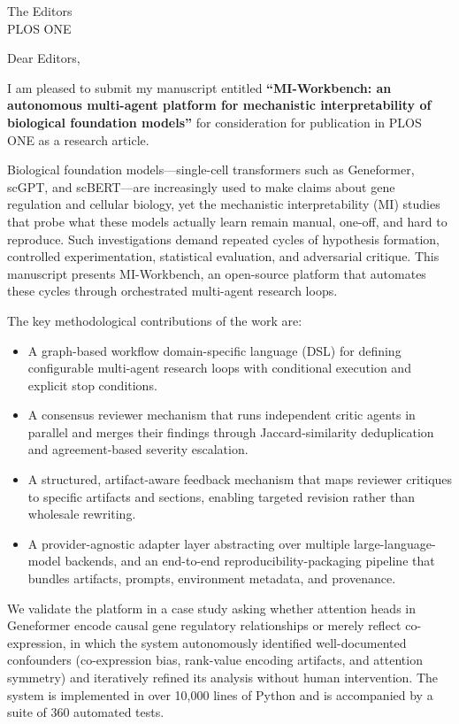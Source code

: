 \documentclass[11pt,letterpaper]{letter}
\begin{document}
\begin{letter}{The Editors \\ PLOS ONE}

\opening{Dear Editors,}

I am pleased to submit my manuscript entitled \textbf{``MI-Workbench: an autonomous multi-agent platform for mechanistic interpretability of biological foundation models''} for consideration for publication in PLOS ONE as a research article.

Biological foundation models---single-cell transformers such as Geneformer, scGPT, and scBERT---are increasingly used to make claims about gene regulation and cellular biology, yet the mechanistic interpretability (MI) studies that probe what these models actually learn remain manual, one-off, and hard to reproduce. Such investigations demand repeated cycles of hypothesis formation, controlled experimentation, statistical evaluation, and adversarial critique. This manuscript presents MI-Workbench, an open-source platform that automates these cycles through orchestrated multi-agent research loops.

The key methodological contributions of the work are:

\begin{itemize}
  \item A graph-based workflow domain-specific language (DSL) for defining configurable multi-agent research loops with conditional execution and explicit stop conditions.
  \item A consensus reviewer mechanism that runs independent critic agents in parallel and merges their findings through Jaccard-similarity deduplication and agreement-based severity escalation.
  \item A structured, artifact-aware feedback mechanism that maps reviewer critiques to specific artifacts and sections, enabling targeted revision rather than wholesale rewriting.
  \item A provider-agnostic adapter layer abstracting over multiple large-language-model backends, and an end-to-end reproducibility-packaging pipeline that bundles artifacts, prompts, environment metadata, and provenance.
\end{itemize}

We validate the platform in a case study asking whether attention heads in Geneformer encode causal gene regulatory relationships or merely reflect co-expression, in which the system autonomously identified well-documented confounders (co-expression bias, rank-value encoding artifacts, and attention symmetry) and iteratively refined its analysis without human intervention. The system is implemented in over 10,000 lines of Python and is accompanied by a suite of 360 automated tests.


\end{letter}
\end{document}
